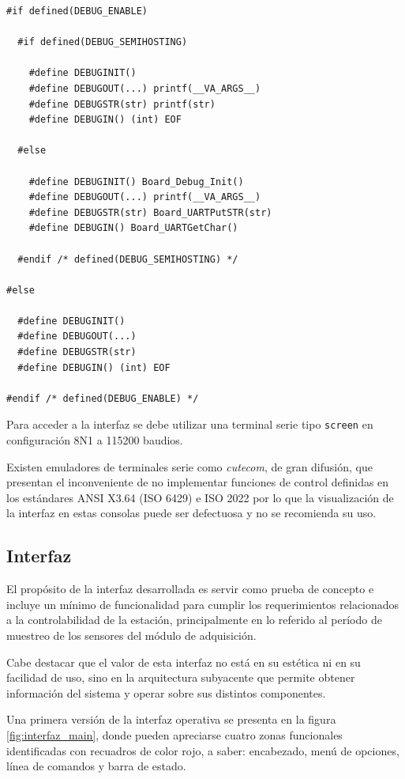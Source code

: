 \begin{lstlisting}[caption={Macros para habilitar/deshabilitar mensajes de depuración del código.},label={lst:debug}]
#if defined(DEBUG_ENABLE)

  #if defined(DEBUG_SEMIHOSTING)

    #define DEBUGINIT()
    #define DEBUGOUT(...) printf(__VA_ARGS__)
    #define DEBUGSTR(str) printf(str)
    #define DEBUGIN() (int) EOF

  #else

    #define DEBUGINIT() Board_Debug_Init()
    #define DEBUGOUT(...) printf(__VA_ARGS__)
    #define DEBUGSTR(str) Board_UARTPutSTR(str)
    #define DEBUGIN() Board_UARTGetChar()

  #endif /* defined(DEBUG_SEMIHOSTING) */

#else

  #define DEBUGINIT()
  #define DEBUGOUT(...)
  #define DEBUGSTR(str)
  #define DEBUGIN() (int) EOF

#endif /* defined(DEBUG_ENABLE) */
\end{lstlisting}

Para acceder a la interfaz se debe utilizar una terminal serie tipo \texttt{screen} \citep{screen} en configuración 8N1 a 115200 baudios.

Existen emuladores de terminales serie como \textit{cutecom}, de gran difusión, que presentan el inconveniente de no implementar funciones de control definidas en los estándares ANSI X3.64 (ISO 6429) e ISO 2022 por lo que la visualización de la interfaz en estas consolas puede ser defectuosa y no se recomienda su uso.


\subsection{Interfaz}
\label{subsec:interfaz}

El propósito de la interfaz desarrollada es servir como prueba de concepto e incluye un mínimo de funcionalidad para cumplir los requerimientos relacionados a la controlabilidad de la estación, principalmente en lo referido al período de muestreo de los sensores del módulo de adquisición.

Cabe destacar que el valor de esta interfaz no está en su estética ni en su facilidad de uso, sino en la arquitectura subyacente que permite obtener información del sistema y operar sobre sus distintos componentes.

Una primera versión de la interfaz operativa se presenta en la figura \ref{fig:interfaz_main}, donde pueden apreciarse cuatro zonas funcionales identificadas con recuadros de color rojo, a saber: encabezado, menú de opciones, línea de comandos y barra de estado.

